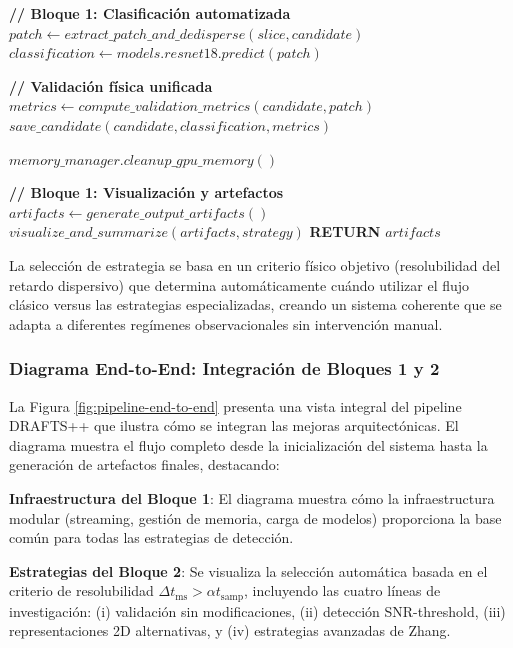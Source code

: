 \begin{algorithm}[H]
\begin{algorithmic}[1]
                \State \textbf{// Bloque 1: Clasificación automatizada}
                \State $patch \leftarrow extract\_patch\_and\_dedisperse(slice, candidate)$
                \State $classification \leftarrow models.resnet18.predict(patch)$
                
                \State \textbf{// Validación física unificada}
                    \State $metrics \leftarrow compute\_validation\_metrics(candidate, patch)$
                    \State $save\_candidate(candidate, classification, metrics)$
                \EndIf
            \EndFor
            
            \State $memory\_manager.cleanup\_gpu\_memory()$ 
        \EndFor
    \EndFor
    
    \State \textbf{// Bloque 1: Visualización y artefactos}
    \State $artifacts \leftarrow generate\_output\_artifacts()$
    \State $visualize\_and\_summarize(artifacts, strategy)$
    \State \textbf{RETURN} $artifacts$
\EndFunction
\end{algorithmic}
\end{algorithm}

La selección de estrategia se basa en un criterio físico objetivo (resolubilidad del retardo dispersivo) que determina automáticamente cuándo utilizar el flujo clásico versus las estrategias especializadas, creando un sistema coherente que se adapta a diferentes regímenes observacionales sin intervención manual.

\subsubsection{Diagrama End-to-End: Integración de Bloques 1 y 2}

La Figura \ref{fig:pipeline-end-to-end} presenta una vista integral del pipeline DRAFTS++ que ilustra cómo se integran las mejoras arquitectónicas. El diagrama muestra el flujo completo desde la inicialización del sistema hasta la generación de artefactos finales, destacando:

\textbf{Infraestructura del Bloque 1}: El diagrama muestra cómo la infraestructura modular (streaming, gestión de memoria, carga de modelos) proporciona la base común para todas las estrategias de detección.

\textbf{Estrategias del Bloque 2}: Se visualiza la selección automática basada en el criterio de resolubilidad $\Delta t_{\mathrm{ms}} > \alpha t_{\mathrm{samp}}$, incluyendo las cuatro líneas de investigación: (i) validación sin modificaciones, (ii) detección SNR-threshold, (iii) representaciones 2D alternativas, y (iv) estrategias avanzadas de Zhang.

